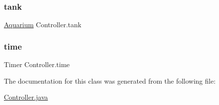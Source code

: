 \mbox{\label{class_controller_ad36875a9a542b89d92583d79567db811}} 
\subsubsection{\texorpdfstring{tank}{tank}}
{\footnotesize\ttfamily \mbox{\hyperlink{class_aquarium}{Aquarium}} Controller.\+tank\hspace{0.3cm}{\ttfamily [private]}}

\mbox{\label{class_controller_a2f43fd03a6aee6119a7d2d090555194b}} 
\subsubsection{\texorpdfstring{time}{time}}
{\footnotesize\ttfamily Timer Controller.\+time\hspace{0.3cm}{\ttfamily [private]}}



The documentation for this class was generated from the following file\+:\begin{DoxyCompactItemize}
\item 
\mbox{\hyperlink{_controller_8java}{Controller.\+java}}\end{DoxyCompactItemize}
